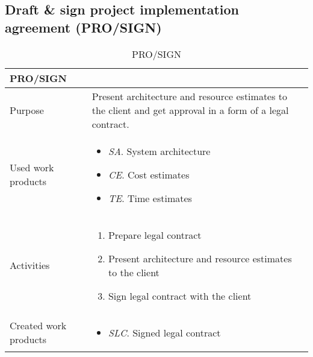 \newpage

\subsection{Draft \& sign project implementation agreement (PRO/SIGN)}
\begin{table}[h!]
\begin{tabular}{l|p{}}
\hline
\textbf{PRO/SIGN}        & \textbf{} \\ \hline
Purpose &  Present architecture and resource estimates to the client and get approval in a form of a legal contract. \\ \hline
Used work products    &      
\begin{itemize}
    \item \textit{SA}. System architecture
    \item \textit{CE}. Cost estimates
    \item \textit{TE}. Time estimates
\end{itemize}
\\ \hline
Activities            &   
\begin{enumerate}
    \item Prepare legal contract
    \item Present architecture and resource estimates to the client
    \item Sign legal contract with the client
\end{enumerate}
\\ \hline
Created work products &     
\begin{itemize}
    \item \textit{SLC}. Signed legal contract 
\end{itemize}
\end{tabular}
\caption{PRO/SIGN}
\label{pro/sign}
\end{table}

\newpage
